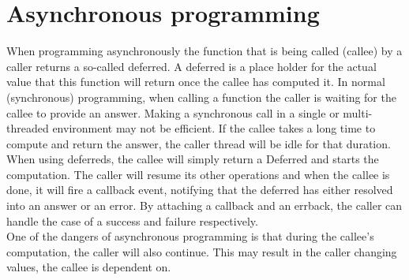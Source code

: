
\section{Asynchronous programming}
\label{sec:async-programming}

When programming asynchronously the function that is being called (callee) by a caller returns a so-called deferred.
A deferred is a place holder for the actual value that this function will return once the callee has computed it.
In normal (synchronous) programming, when calling a function the caller is waiting for the callee to provide an answer. 
Making a synchronous call in a single or multi-threaded environment may not be efficient.
If the callee takes a long time to compute and return the answer, the caller thread will be idle for that duration.
When using deferreds, the callee will simply return a Deferred and starts the computation.
The caller will resume its other operations and when the callee is done, it will fire a callback event, notifying that the deferred has either resolved into an answer or an error.
By attaching a callback and an errback, the caller can handle the case of a success and failure respectively.\\

One of the dangers of asynchronous programming is that during the callee's computation, the caller will also continue.
This may result in the caller changing values, the callee is dependent on.

